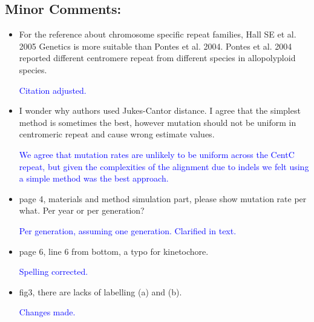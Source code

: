 \documentclass[]{article}
\newcommand{\res}[1]{\noindent \textcolor{blue}{{#1}} \\}
\begin{document}
\subsection*{Minor Comments:}

\begin{itemize}
\item For the reference about chromosome specific repeat families, Hall SE et al. 2005 Genetics is more suitable than Pontes et al. 2004. Pontes et al. 2004 reported different centromere repeat from different species in allopolyploid species.

\res{Citation adjusted.}

\item I wonder why authors used Jukes-Cantor distance. I agree that the simplest method is sometimes the best, however mutation should not be uniform in centromeric repeat and cause wrong estimate values. 

\res{We agree that mutation rates are unlikely to be uniform across the CentC repeat, but given the complexities of the alignment due to indels we felt using a simple method was the best approach. }

\item page 4, materials and method simulation part, please show mutation rate per what. Per year or per generation? 

\res{Per generation, assuming one generation.  Clarified in text.}

\item page 6, line 6 from bottom, a typo for kinetochore.

\res{Spelling corrected.}

\item fig3, there are lacks of labelling (a) and (b). 

\res{Changes made.}

\end{itemize}
\end{document}
